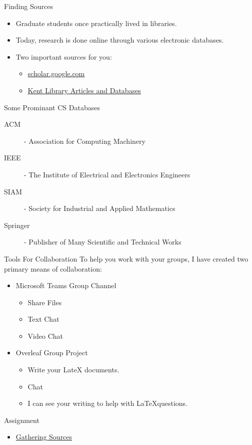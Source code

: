 \documentclass[handout]{beamer}
\begin{document}
\begin{frame}{Finding Sources}
    \begin{itemize}
        \item Graduate students once practically lived in libraries.
        \item Today, research is done online through various electronic databases.
        \item Two important sources for you:
        \begin{itemize}
           \item \href{https://scholar.google.com}{scholar.google.com}
           \item \href{https://library.semo.edu/find-materials/articles-and-databases}{Kent Library Articles and Databases}
        \end{itemize}
    \end{itemize}
\end{frame}

\begin{frame}{Some Prominant CS Databases}
    \begin{description}
        \item[ACM] - Association for Computing Machinery
        \item[IEEE] - The Institute of Electrical and Electronics Engineers 
        \item[SIAM] - Society for Industrial and Applied Mathematics
        \item[Springer] - Publisher of Many Scientific and Technical Works
    \end{description}
\end{frame}

\begin{frame}{Tools For Collaboration}
    To help you work with your groups, I have created two primary means of collaboration:
    \begin{itemize}
        \item Microsoft Teams Group Channel
        \begin{itemize}
            \item Share Files
            \item Text Chat
            \item Video Chat
        \end{itemize}
        \item Overleaf Group Project
        \begin{itemize}
            \item Write your LateX documents.
            \item Chat
            \item I can see your writing to help with \LaTeX questions.
        \end{itemize}
    \end{itemize}
\end{frame}

\begin{frame}{Assignment}
    \begin{itemize}
        \item \href{https://semo.instructure.com/courses/9573/assignments/82356?module_item_id=340086}{Gathering Sources}
    \end{itemize}
\end{frame}
\end{document}
